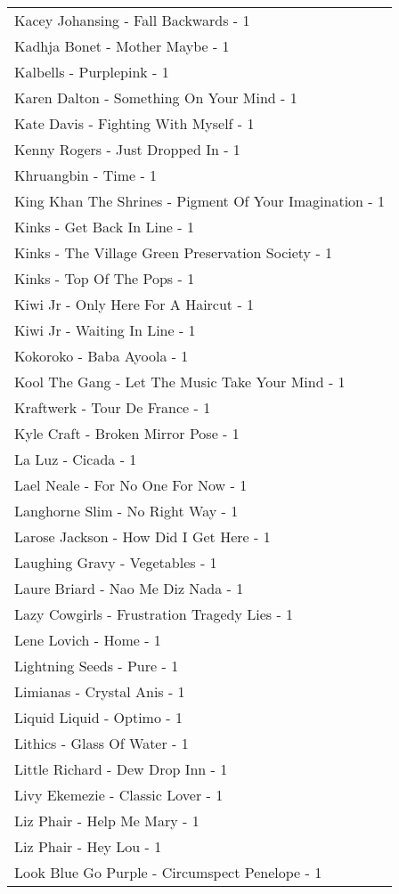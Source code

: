 \documentclass[
]{article}
\begin{document}
\begin{longtable}{l}
Kacey Johansing - Fall Backwards - 1 \\ 
Kadhja Bonet - Mother Maybe - 1 \\ 
Kalbells - Purplepink - 1 \\ 
Karen Dalton - Something On Your Mind - 1 \\ 
Kate Davis - Fighting With Myself - 1 \\ 
Kenny Rogers - Just Dropped In - 1 \\ 
Khruangbin - Time - 1 \\ 
King Khan The Shrines - Pigment Of Your Imagination - 1 \\ 
Kinks - Get Back In Line - 1 \\ 
Kinks - The Village Green Preservation Society - 1 \\ 
Kinks - Top Of The Pops - 1 \\ 
Kiwi Jr - Only Here For A Haircut - 1 \\ 
Kiwi Jr - Waiting In Line - 1 \\ 
Kokoroko - Baba Ayoola - 1 \\ 
Kool The Gang - Let The Music Take Your Mind - 1 \\ 
Kraftwerk - Tour De France - 1 \\ 
Kyle Craft - Broken Mirror Pose - 1 \\ 
La Luz - Cicada - 1 \\ 
Lael Neale - For No One For Now - 1 \\ 
Langhorne Slim - No Right Way - 1 \\ 
Larose Jackson - How Did I Get Here - 1 \\ 
Laughing Gravy - Vegetables - 1 \\ 
Laure Briard - Nao Me Diz Nada - 1 \\ 
Lazy Cowgirls - Frustration Tragedy Lies - 1 \\ 
Lene Lovich - Home - 1 \\ 
Lightning Seeds - Pure - 1 \\ 
Limianas - Crystal Anis - 1 \\ 
Liquid Liquid - Optimo - 1 \\ 
Lithics - Glass Of Water - 1 \\ 
Little Richard - Dew Drop Inn - 1 \\ 
Livy Ekemezie - Classic Lover - 1 \\ 
Liz Phair - Help Me Mary - 1 \\ 
Liz Phair - Hey Lou - 1 \\ 
Look Blue Go Purple - Circumspect Penelope - 1 \\ 

\end{longtable}
\end{document}
